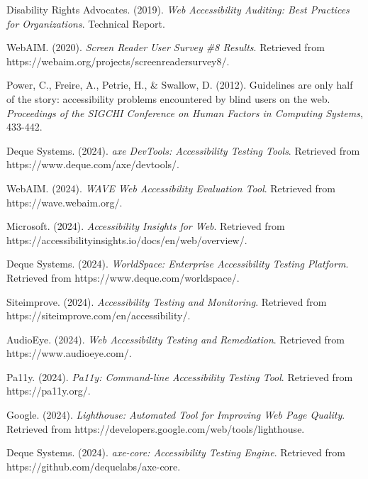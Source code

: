 \begin{thebibliography}{99}

 Disability Rights Advocates. (2019). \textit{Web Accessibility Auditing: Best Practices for Organizations}. Technical Report.

 WebAIM. (2020). \textit{Screen Reader User Survey \#8 Results}. Retrieved from https://webaim.org/projects/screenreadersurvey8/.

 Power, C., Freire, A., Petrie, H., \& Swallow, D. (2012). Guidelines are only half of the story: accessibility problems encountered by blind users on the web. \textit{Proceedings of the SIGCHI Conference on Human Factors in Computing Systems}, 433-442.

 Deque Systems. (2024). \textit{axe DevTools: Accessibility Testing Tools}. Retrieved from https://www.deque.com/axe/devtools/.

 WebAIM. (2024). \textit{WAVE Web Accessibility Evaluation Tool}. Retrieved from https://wave.webaim.org/.

 Microsoft. (2024). \textit{Accessibility Insights for Web}. Retrieved from https://accessibilityinsights.io/docs/en/web/overview/.

 Deque Systems. (2024). \textit{WorldSpace: Enterprise Accessibility Testing Platform}. Retrieved from https://www.deque.com/worldspace/.

 Siteimprove. (2024). \textit{Accessibility Testing and Monitoring}. Retrieved from https://siteimprove.com/en/accessibility/.

 AudioEye. (2024). \textit{Web Accessibility Testing and Remediation}. Retrieved from https://www.audioeye.com/.

 Pa11y. (2024). \textit{Pa11y: Command-line Accessibility Testing Tool}. Retrieved from https://pa11y.org/.

 Google. (2024). \textit{Lighthouse: Automated Tool for Improving Web Page Quality}. Retrieved from https://developers.google.com/web/tools/lighthouse.

 Deque Systems. (2024). \textit{axe-core: Accessibility Testing Engine}. Retrieved from https://github.com/dequelabs/axe-core.

\end{thebibliography}
